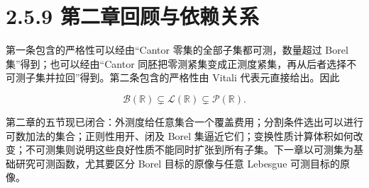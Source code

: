 \documentclass[11pt,a4paper]{article}
\begin{document}
\section[\S{}2.5.9
第二章回顾与依赖关系]{2.5.9
第二章回顾与依赖关系}\label{ux7b2cux4e8cux7ae0ux56deux987eux4e0eux4f9dux8d56ux5173ux7cfb}

第一条包含的严格性可以经由``Cantor 零集的全部子集都可测，数量超过 Borel
集''得到；也可以经由``Cantor
同胚把零测紧集变成正测度紧集，再从后者选择不可测子集并拉回''得到。第二条包含的严格性由
Vitali 代表元直接给出。因此

\begin{equation*}
\mathcal B(\mathbb R)\subsetneq\mathcal L(\mathbb R)\subsetneq\mathcal P(\mathbb R).
\tag{2.5.14}
\end{equation*}

第二章的五节现已闭合：外测度给任意集合一个覆盖费用；分割条件选出可以进行可数加法的集合；正则性用开、闭及
Borel
集逼近它们；变换性质计算体积如何改变；不可测集则说明这些良好性质不能同时扩张到所有子集。下一章以可测集为基础研究可测函数，尤其要区分
Borel 目标的原像与任意 Lebesgue 可测目标的原像。
\end{document}

